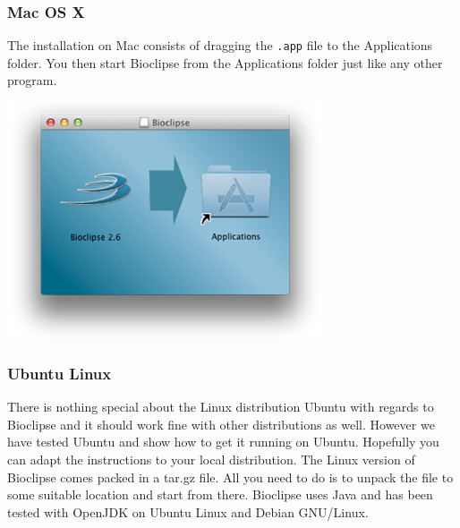 \documentclass[a5paper, 10pt]{memoir}
\begin{document}
\begin{refsection}
\subsubsection{Mac OS X}
The installation on Mac consists of dragging the \texttt{.app} file to the
Applications folder. You then start Bioclipse from the Applications folder just
like any other program. 
\begin{center}
\includegraphics[width=0.7\textwidth]{images/MacInstaller.png}
\end{center}
\subsubsection{Ubuntu Linux}
There is nothing special about the Linux distribution Ubuntu with regards to
Bioclipse and it should work fine with other distributions as well. However we
have tested Ubuntu and show how to get it running on Ubuntu. Hopefully you can
adapt the instructions to your local distribution.
The Linux version of Bioclipse comes packed in a tar.gz file. All you need to
do is to unpack the file to some suitable location and start from there.
Bioclipse uses Java and has been tested with OpenJDK on Ubuntu Linux and Debian
GNU/Linux. 


\end{refsection}
\end{document}
